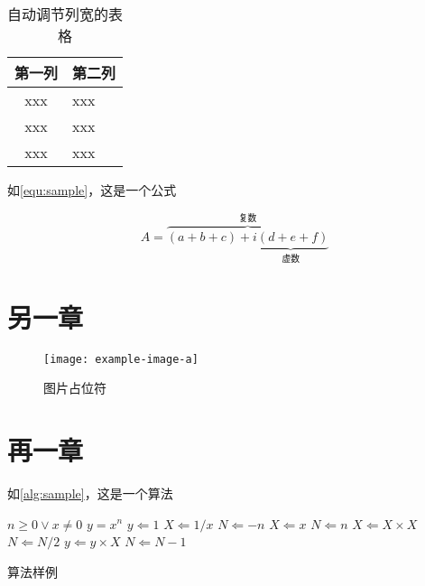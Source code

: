 \begin{table}[htbp]
    \caption{\label{tab:sample}自动调节列宽的表格}
    \begin{tabularx}{\linewidth}{c|X<{\centering}}
        \hline
        第一列 & 第二列 \\ \hline
        xxx & xxx \\ \hline
        xxx & xxx \\ \hline
        xxx & xxx \\ \hline
    \end{tabularx}
\end{table}


\par 如\autoref{equ:sample}，这是一个公式

\begin{equation}
    \label{equ:sample}
    A=\overbrace{(a+b+c)+\underbrace{i(d+e+f)}_{\text{虚数}}}^{\text{复数}}
\end{equation}

\chapter{另一章}


\begin{figure}[htbp]
    \centering
    \texttt{[image: example-image-a]}
    \caption{\label{fig:fig-placeholder}图片占位符}
\end{figure}

\chapter{再一章}

\par 如\autoref{alg:sample}，这是一个算法

\begin{algorithm}[H]
    \begin{algorithmic} %
        \REQUIRE $n \geq 0 \vee x \neq 0$
        \ENSURE $y = x^n$
        \STATE $y \Leftarrow 1$
        \STATE $X \Leftarrow 1 / x$
        \STATE $N \Leftarrow -n$
        \ELSE
        \STATE $X \Leftarrow x$
        \STATE $N \Leftarrow n$
        \ENDIF
        \STATE $X \Leftarrow X \times X$
        \STATE $N \Leftarrow N / 2$
        \ELSE[$N$ is odd]
        \STATE $y \Leftarrow y \times X$
        \STATE $N \Leftarrow N - 1$
        \ENDIF
        \ENDWHILE
    \end{algorithmic}
    \caption{\label{alg:sample}算法样例}
\end{algorithm}